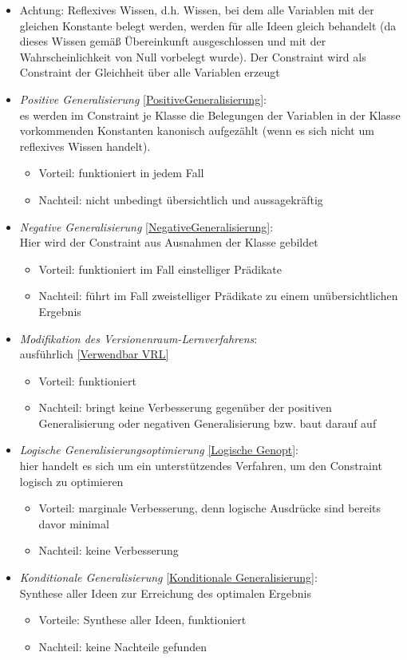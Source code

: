 \documentclass[a4paper, 11pt]{book}
\begin{document}
{\begin{itemize}
	\item Achtung: Reflexives Wissen, d.h. Wissen, bei dem alle Variablen mit der gleichen Konstante belegt werden, werden für alle Ideen gleich behandelt (da dieses Wissen gemäß Übereinkunft ausgeschlossen und mit der Wahrscheinlichkeit von Null vorbelegt wurde). Der Constraint wird als Constraint der Gleichheit über alle Variablen erzeugt
	\item\textit{Positive Generalisierung} \ref{PositiveGeneralisierung}: \\
	es werden im Constraint je Klasse die Belegungen der Variablen in der Klasse vorkommenden Konstanten kanonisch aufgezählt (wenn es sich nicht um reflexives Wissen handelt).\\
	\begin{itemize}
		\item Vorteil: funktioniert in jedem Fall
		\item Nachteil: nicht unbedingt übersichtlich und aussagekräftig 
	\end{itemize}
	\item \textit{Negative Generalisierung} \ref{NegativeGeneralisierung}:\\
	Hier wird der Constraint aus Ausnahmen der Klasse gebildet
	\begin{itemize}
		\item Vorteil: funktioniert im Fall einstelliger Prädikate
		\item Nachteil: führt im Fall zweistelliger Prädikate zu einem unübersichtlichen Ergebnis 
	\end{itemize}
	\item \textit{Modifikation des Versionenraum-Lernverfahrens}:\\
	ausführlich \ref{Verwendbar VRL}
	\begin{itemize}
		\item Vorteil: funktioniert 
		\item Nachteil: bringt keine Verbesserung gegenüber der positiven Generalisierung oder negativen Generalisierung bzw. baut darauf auf
	\end{itemize}
	\item \textit{Logische Generalisierungsoptimierung} \ref{Logische Genopt}:\\
	hier handelt es sich um ein unterstützendes Verfahren, um den Constraint logisch zu optimieren 
		\begin{itemize}
		\item Vorteil: marginale Verbesserung, denn logische Ausdrücke sind bereits davor minimal
		\item Nachteil: keine Verbesserung
	\end{itemize}
	\item \textit{Konditionale Generalisierung} \ref{Konditionale Generalisierung}:\\
	Synthese aller Ideen zur Erreichung des optimalen Ergebnis
	\begin{itemize}
	\item Vorteile: Synthese aller Ideen, funktioniert
	\item Nachteil: keine Nachteile gefunden
\end{itemize}


\end{itemize}}
\end{document}
